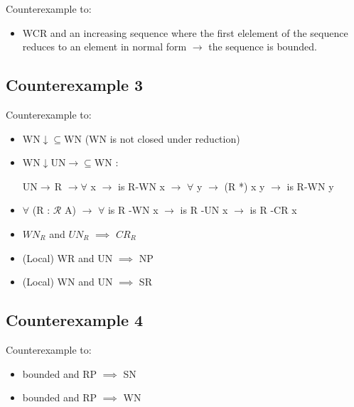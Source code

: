 \documentclass{scrartcl}
\begin{document}
Counterexample to:
\begin{itemize}
  \item WCR and an increasing sequence where the first elelement of the sequence reduces to an element in normal form $\to$
  the sequence is bounded.
\end{itemize}


\subsection*{Counterexample 3}
\begin{center}
\end{center}

Counterexample to:
\begin{itemize}
  \item WN$\downarrow\subseteq$WN (WN is not closed under reduction) 
  \item WN$\downarrow$UN$\rightarrow\subseteq$WN :

  UN$\rightarrow\,$R $\to \forall$ x $\to$ is R-WN x $\to$ $\forall$ y $\to$ (R *) x y $\to$ is R-WN y

  \item $\forall$ (R : $\mathscr{R}$ A) $\to$ $\forall$ is R -WN x $\to$ is R -UN x $\to$ is R -CR x
  \item $WN_R$ and $UN_R$ $\implies$ $CR_R$
  \item (Local) WR and UN $\implies$ NP 
  \item (Local) WN and UN $\implies$ SR

\end{itemize}

\subsection*{Counterexample 4}

\begin{center}
\end{center}
Counterexample to:
\begin{itemize}
  \item bounded and RP $\implies$ SN
  \item bounded and RP $\implies$ WN
\end{itemize}
\end{document}
